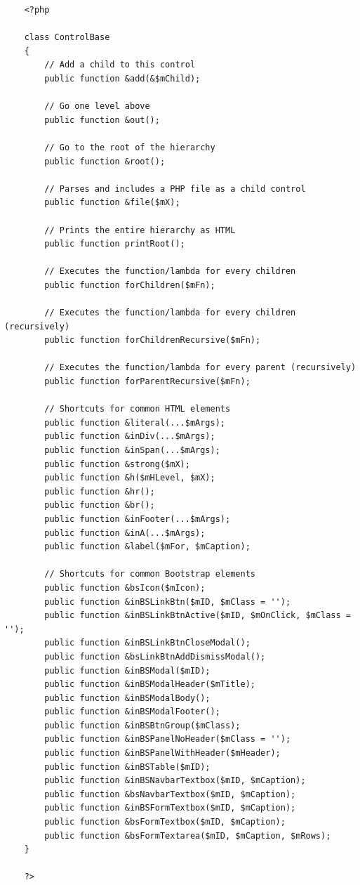 \documentclass[12pt]{report}
\begin{document}
                    \begin{verbatim}
    <?php

    class ControlBase
    {
        // Add a child to this control
        public function &add(&$mChild);

        // Go one level above
        public function &out();

        // Go to the root of the hierarchy
        public function &root();

        // Parses and includes a PHP file as a child control
        public function &file($mX);

        // Prints the entire hierarchy as HTML
        public function printRoot();

        // Executes the function/lambda for every children
        public function forChildren($mFn);

        // Executes the function/lambda for every children (recursively)
        public function forChildrenRecursive($mFn);

        // Executes the function/lambda for every parent (recursively)
        public function forParentRecursive($mFn);

        // Shortcuts for common HTML elements
        public function &literal(...$mArgs);
        public function &inDiv(...$mArgs);
        public function &inSpan(...$mArgs);
        public function &strong($mX);
        public function &h($mHLevel, $mX);
        public function &hr();
        public function &br();
        public function &inFooter(...$mArgs);
        public function &inA(...$mArgs);
        public function &label($mFor, $mCaption);

        // Shortcuts for common Bootstrap elements
        public function &bsIcon($mIcon);
        public function &inBSLinkBtn($mID, $mClass = '');
        public function &inBSLinkBtnActive($mID, $mOnClick, $mClass = '');
        public function &inBSLinkBtnCloseModal();
        public function &bsLinkBtnAddDismissModal();
        public function &inBSModal($mID);
        public function &inBSModalHeader($mTitle);
        public function &inBSModalBody();
        public function &inBSModalFooter();
        public function &inBSBtnGroup($mClass);
        public function &inBSPanelNoHeader($mClass = '');
        public function &inBSPanelWithHeader($mHeader);
        public function &inBSTable($mID);
        public function &inBSNavbarTextbox($mID, $mCaption);
        public function &bsNavbarTextbox($mID, $mCaption);
        public function &inBSFormTextbox($mID, $mCaption);
        public function &bsFormTextbox($mID, $mCaption);
        public function &bsFormTextarea($mID, $mCaption, $mRows);
    }

    ?>
                    \end{verbatim}            
\end{document}
